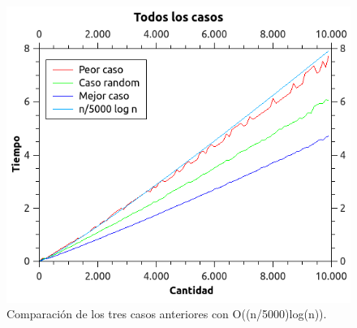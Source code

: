 \begin{figure}[H]
\begin{center}

  \includegraphics[width=\linewidth]{../graficos/ej2/Todos.png}
  \caption{{\small Comparación de los tres casos anteriores con O((n/5000)log(n)).}} \label{ej2-todos-casos}
\endminipage

\end{center}
\end{figure}
